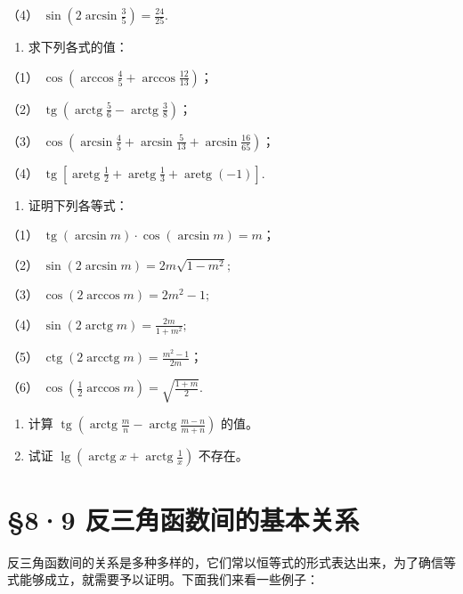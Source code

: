 （4） \(\sin \left(2\arcsin \frac{3}{5}\right) = \frac{24}{25}\).

\begin{enumerate}[start=4]
\item
  求下列各式的值：
\end{enumerate}

（1）
\(\cos \left(\arccos \frac{4}{5} + \arccos \frac{12}{13}\right)\)；

（2）
\(\operatorname{tg}\left(\operatorname{arctg}\frac{5}{6} - \operatorname{arctg}\frac{3}{8}\right)\)；

（3）
\(\cos \left(\arcsin \frac{4}{5} + \arcsin \frac{5}{13} + \arcsin \frac{16}{65}\right)\)；

（4）
\(\operatorname{tg}\left[\operatorname{aretg}\frac{1}{2} + \operatorname{aretg}\frac{1}{3} + \operatorname{aretg}(-1)\right]\).

\begin{enumerate}[start=5]
\item
  证明下列各等式：
\end{enumerate}

（1） \(\operatorname{tg}(\arcsin m) \cdot \cos(\arcsin m) = m\)；

（2） \(\sin (2\arcsin m) = 2m\sqrt{1 - m^2};\)

（3） \(\cos (2\arccos m) = 2m^2 - 1;\)

（4） \(\sin (2\operatorname{arctg} m) = \frac{2m}{1 + m^2};\)

（5）
\(\operatorname{ctg}(2\operatorname{arcctg} m) = \frac{m^2 - 1}{2m}\)；

（6）
\(\cos \left(\frac{1}{2} \arccos m\right) = \sqrt{\frac{1 + m}{2}}.\)

\begin{enumerate}[start=6]
\item
  计算
  \(\operatorname{tg}\left(\operatorname{arctg}\frac{m}{n} - \operatorname{arctg}\frac{m - n}{m + n}\right)\)
  的值。
\item
  试证
  \(\lg \left(\operatorname{arctg} x + \operatorname{arctg} \frac{1}{x}\right)\)
  不存在。
\end{enumerate}

\section{§8·9 反三角函数间的基本关系}

反三角函数间的关系是多种多样的，它们常以恒等式的形式表达出来，为了确信等式能够成立，就需要予以证明。下面我们来看一些例子：

